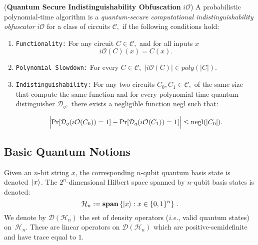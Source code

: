 
\begin{definition}\label{def:qiO} {\rm({\bf Quantum Secure Indistinguishability Obfuscation} $i\mathcal{O}$)}
A probabilistic polynomial-time algorithm is a \emph{quantum-secure computational indistinguishability obfuscator} $i\mathcal{O}$ for a class of circuits ${\mathcal C},$ if the following conditions hold:

\begin{enumerate}
\item {\tt Functionality:} For any circuit $C\in {\mathcal C},$ and for all inputs $x$ $$i\mathcal{O}(C)(x)=C(x).$$
\item  {\tt Polynomial Slowdown:}  For every $C\in \mathcal{C},$  $|i\mathcal{O}(C)| \in poly(|C|).$
\item {\tt Indistinguishability:} For any two circuits $C_0,C_1\in {\mathcal C},$ of the same size  that compute the same function
 and for every polynomial time quantum distinguisher $\mathcal{D}_q,$  there exists a negligible function {\rm negl} such that:

					$$\Big | {\rm Pr}[\mathcal{D}_q(i\mathcal{O}(C_0))=1]-{\rm Pr}[\mathcal{D}_q(i\mathcal{O}(C_1))=1] \Big |\leq  {\rm negl}(|C_0|).$$			
\end{enumerate}										
\end{definition}



\subsection{Basic Quantum Notions}
\label{sec:quantum-prelims}
Given an $n$-bit string $x$, the corresponding  $n$-qubit quantum basis state is denoted~${\lvert}x\rangle$. The $2^n$-dimensional Hilbert space spanned by $n$-qubit basis states is denoted:
\begin{equation}
\label{eq:hilbert-space}
\mathcal{H}_n := \textbf{span} \left\{ {\lvert}x\rangle : x \in \{0,1\}^{n} \right\}\,.
\end{equation}
We denote by $\mathcal{D}(\mathcal{H}_n)$ the set of density operators (\emph{i.e.}, valid quantum states) on~$\mathcal{H}_n$. These are linear operators on $\mathcal{D}(\mathcal{H}_n)$ which are positive-semidefinite and have trace equal to $1.$


